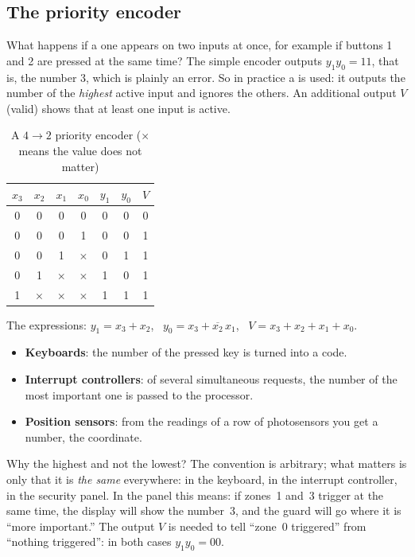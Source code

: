 \subsection{The priority encoder}

What happens if a one appears on two inputs at once, for example if
buttons 1 and 2 are pressed at the same time? The simple encoder outputs $y_1y_0 = 11$, that is,
the number 3, which is plainly an error. So in practice a
 is used: it outputs the number of the \emph{highest} active
input and ignores the others. An additional output $V$ (valid) shows
that at least one input is active.

\begin{table}[H]
\centering
\caption{A $4\to2$ priority encoder ($\times$ means the value does not matter)}
\begin{tabular}{cccc|ccc}
\toprule
$x_3$ & $x_2$ & $x_1$ & $x_0$ & $y_1$ & $y_0$ & $V$ \\
\midrule
0 & 0 & 0 & 0 & 0 & 0 & 0 \\
0 & 0 & 0 & 1 & 0 & 0 & 1 \\
0 & 0 & 1 & $\times$ & 0 & 1 & 1 \\
0 & 1 & $\times$ & $\times$ & 1 & 0 & 1 \\
1 & $\times$ & $\times$ & $\times$ & 1 & 1 & 1 \\
\bottomrule
\end{tabular}
\end{table}

The expressions: $y_1 = x_3 + x_2$, \ $y_0 = x_3 + \overline{x_2}\,x_1$, \
$V = x_3 + x_2 + x_1 + x_0$.

\begin{infobox}
\begin{itemize}
  \item \textbf{Keyboards}: the number of the pressed key is turned into a code.
  \item \textbf{Interrupt controllers}: of several simultaneous requests,
        the number of the most important one is passed to the processor.
  \item \textbf{Position sensors}: from the readings of a row of photosensors
        you get a number, the coordinate.
\end{itemize}
\end{infobox}

Why the highest and not the lowest? The convention is arbitrary; what matters
is only that it is \emph{the same} everywhere: in the keyboard, in the interrupt
controller, in the security panel. In the panel this means: if zones~1 and~3 trigger
at the same time, the display will show the number~3, and the guard
will go where it is ``more important.'' The output $V$ is needed to tell ``zone~0
triggered'' from ``nothing triggered'': in both cases $y_1y_0=00$.

